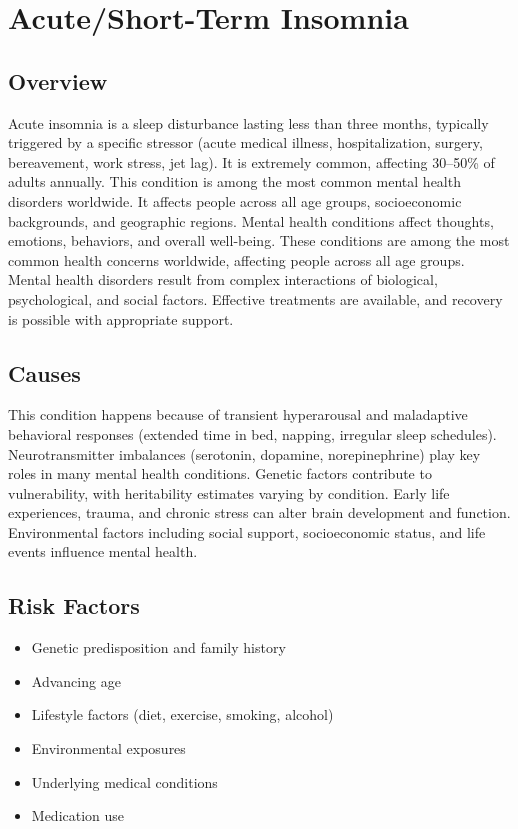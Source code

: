 \chapter{Acute/Short-Term Insomnia}
\label{sec:Acute Short-Term Insomnia}

\section{Overview}
Acute insomnia is a sleep disturbance lasting less than three months, typically triggered by a specific stressor (acute medical illness, hospitalization, surgery, bereavement, work stress, jet lag). It is extremely common, affecting 30--50\% of adults annually. This condition is among the most common mental health disorders worldwide. It affects people across all age groups, socioeconomic backgrounds, and geographic regions. Mental health conditions affect thoughts, emotions, behaviors, and overall well-being. These conditions are among the most common health concerns worldwide, affecting people across all age groups. Mental health disorders result from complex interactions of biological, psychological, and social factors. Effective treatments are available, and recovery is possible with appropriate support.
\section{Causes}
This condition happens because of transient hyperarousal and maladaptive behavioral responses (extended time in bed, napping, irregular sleep schedules).  Neurotransmitter imbalances (serotonin, dopamine, norepinephrine) play key roles in many mental health conditions. Genetic factors contribute to vulnerability, with heritability estimates varying by condition. Early life experiences, trauma, and chronic stress can alter brain development and function. Environmental factors including social support, socioeconomic status, and life events influence mental health.   
\section{Risk Factors}
\begin{itemize}[noitemsep]
  \item Genetic predisposition and family history
  \item Advancing age
  \item Lifestyle factors (diet, exercise, smoking, alcohol)
  \item Environmental exposures
  \item Underlying medical conditions
  \item Medication use
\end{itemize}

